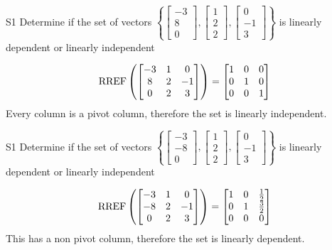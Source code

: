 \begin{problem}{S1}
Determine if the set of vectors $\left\{ \begin{bmatrix} -3 \\ 8 \\ 0 \end{bmatrix}, \begin{bmatrix} 1 \\ 2 \\ 2 \end{bmatrix}, \begin{bmatrix} 0 \\ -1 \\ 3 \end{bmatrix} \right\}$ is  linearly dependent or linearly independent
\end{problem}
\begin{solution}
$$\operatorname{RREF}\left( \begin{bmatrix}-3 & 1 & 0 \\ 8 & 2 & -1 \\ 0 & 2 & 3 \end{bmatrix}\right) = \begin{bmatrix} 1 & 0 & 0 \\ 0 & 1 & 0 \\ 0 & 0 & 1 \end{bmatrix}$$
Every column is a pivot column, therefore the set is linearly independent.
\end{solution}

\begin{problem}{S1}
Determine if the set of vectors $\left\{ \begin{bmatrix} -3 \\ -8 \\ 0 \end{bmatrix}, \begin{bmatrix} 1 \\ 2 \\ 2 \end{bmatrix}, \begin{bmatrix} 0 \\ -1 \\ 3 \end{bmatrix} \right\}$ is  linearly dependent or linearly independent
\end{problem}
\begin{solution}
$$\operatorname{RREF}\left( \begin{bmatrix}-3 & 1 & 0 \\ -8 & 2 & -1 \\ 0 & 2 & 3 \end{bmatrix}\right) = \begin{bmatrix} 1 & 0 & \frac{1}{2} \\ 0 & 1 & \frac{3}{2} \\ 0 & 0 & 0 \end{bmatrix}$$
This has a non pivot column, therefore the set is linearly dependent.
\end{solution}



